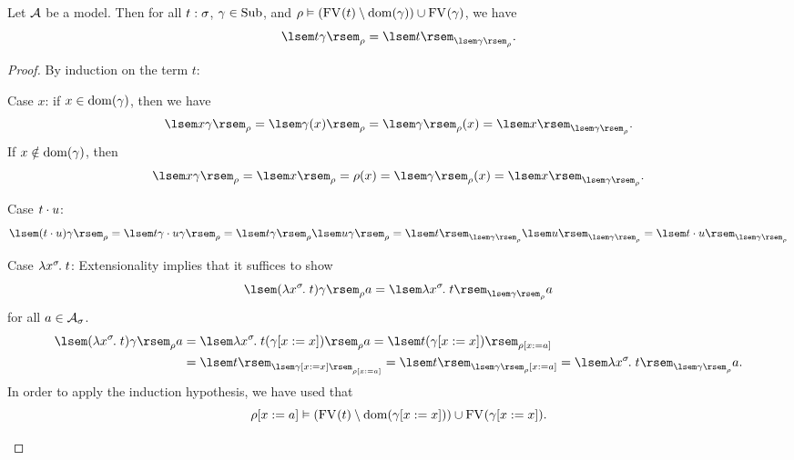 \begin{lem} \label{lem:sub-lemma}
Let $\mathcal{A}$ be a model. Then for all $t : \sigma$, $\gamma \in \mathrm{Sub}$, and $\rho \vDash (\mathrm{FV}_{}(t) \setminus \mathrm{dom}(\gamma)) \cup \mathrm{FV}_{}(\gamma)$, we have 
\[ \sint{\subst{t}{\gamma}}{\rho} = \sint{t}{\sintsub{\gamma}{\rho}}. \]
\begin{proof}
By induction on the term $t$:
\begin{items}
\item Case $x$: if $x \in \mathrm{dom}(\gamma)$, then we have
\[ \sint{\subst{x}{\gamma}}{\rho} = \sint{\gamma(x)}{\rho}
    = \sintsub{\gamma}{\rho}(x) = \sint{x}{\sintsub{\gamma}{\rho}}. \]
If $x \notin \mathrm{dom}(\gamma)$, then
\[ \sint{\subst{x}{\gamma}}{\rho} = \sint{x}{\rho} = \rho(x)
    = \sintsub{\gamma}{\rho}(x) = \sint{x}{\sintsub{\gamma}{\rho}}. \]
\item Case $t \cdot u$:
\[ \sint{\subst{(\app{t}{u})}{\gamma}}{\rho}
    = \sint{\app{\subst{t}{\gamma}}{\subst{u}{\gamma}}}{\rho}
    = \sint{\subst{t}{\gamma}}{\rho} \sint{\subst{u}{\gamma}}{\rho}
    = \sint{t}{\sint{\gamma}{\rho}} \sint{u}{\sint{\gamma}{\rho}}
    = \sint{\app{t}{u}}{\sint{\gamma}{\rho}} \]

\item Case $\lambda x^{\sigma}\hspace{-1pt}.\;t$: Extensionality implies that it suffices to show
\[ \sint{\subst{(\lamv{x}{\sigma}{t})}{\gamma}}{\rho} a
    = \sint{\lamv{x}{\sigma}{t}}{\sintsub{\gamma}{\rho}} a \]
for all $a \in \mathcal{A}_{\sigma}$.
\begin{align*}
\sint{\subst{(\lamv{x}{\sigma}{t})}{\gamma}}{\rho} a
    &= \sint{\lamv{x}{\sigma}{\subst{t}{(\updsub{\gamma}{x}{x})}}}{\rho} a
     = \sint{\subst{t}{(\updsub{\gamma}{x}{x})}}{\updenv{\rho}{x}{a}} \\
    &= \sint{t}{\sint{\updsub{\gamma}{x}{x}}{\updenv{\rho}{x}{a}}}
     = \sint{t}{\updenv{\sint{\gamma}{\rho}}{x}{a}}
     = \sint{\lamv{x}{\sigma}{t}}{\sint{\gamma}{\rho}} a.
\end{align*}
In order to apply the induction hypothesis, we have used that %
\[ \rho[x := a] \vDash (\mathrm{FV}_{}(t) \setminus \mathrm{dom}(\gamma[x := x])) \cup \mathrm{FV}_{}(\gamma[x := x]). \] 


\end{items}
\end{proof}
\end{lem}
